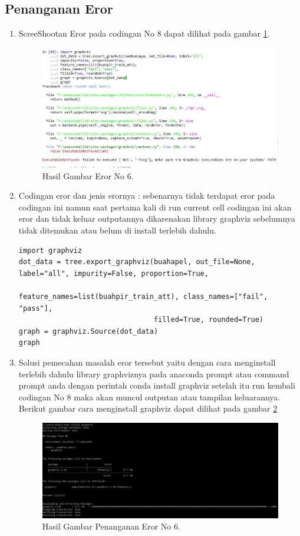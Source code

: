\subsection{Penanganan Eror}
\begin{enumerate}
\item ScreeShootan Eror pada codingan No 8 dapat dilihat pada gambar \ref{21}.
\subitem 
\begin{figure}[!htbp]
		\centerline{\includegraphics[width=1\textwidth]{figures/huda/eror6.JPG}}
		\caption{Hasil Gambar Eror No 6.}
		\label{21}
\end{figure}
\item Codingan eror dan jenis erornya : sebenarnya tidak terdapat eror pada codingan ini namun saat pertama kali di run current cell codingan ini akan eror dan tidak keluar outputannya dikarenakan library graphviz sebelumnya tidak ditemukan atau belum di install terlebih dahulu.
\subitem 
\begin{verbatim}
import graphviz
dot_data = tree.export_graphviz(buahapel, out_file=None, label="all", impurity=False, proportion=True,
                                feature_names=list(buahpir_train_att), class_names=["fail", "pass"], 
                                filled=True, rounded=True)
graph = graphviz.Source(dot_data)
graph
\end{verbatim}
\item Solusi pemecahan masalah eror tersebut yaitu dengan cara menginstall terlebih dahulu library graphviznya pada anaconda prompt atau command prompt anda dengan perintah conda install graphviz setelah itu run kembali codingan No 8 maka akan muncul outputan atau tampilan keluarannya.
\subitem Berikut gambar cara menginstall graphviz dapat dilihat pada gambar \ref{22}
\begin{figure}[!htbp]
		\centerline{\includegraphics[width=1\textwidth]{figures/huda/penangananeror6.JPG}}
		\caption{Hasil Gambar Penanganan Eror No 6.}
		\label{22}
\end{figure}
\end{enumerate}